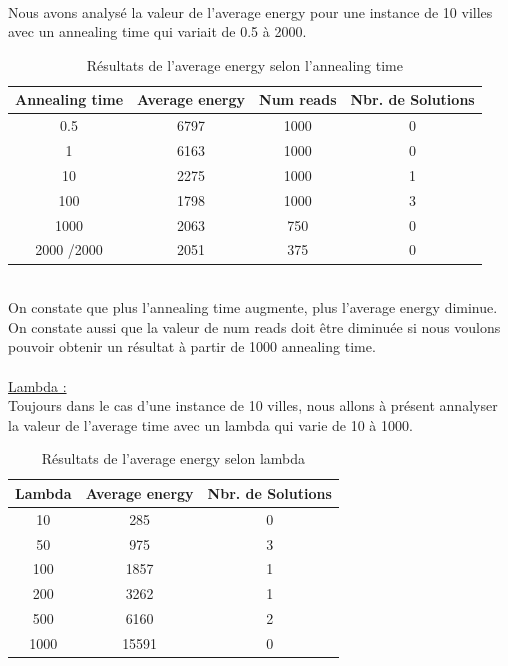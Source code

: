 \documentclass{article}
\begin{document}
        \\
        Nous avons analysé la valeur de l'average energy pour une instance de 10 villes avec un annealing time qui variait de 0.5 à 2000.
        \begin{table}[h]
            \centering
            \begin{tabular}{|c|c|c|c|}
                \hline
                \textbf{Annealing time} & \textbf{Average energy} & \textbf{Num reads} & \textbf{Nbr. de Solutions}\\
                \hline
                0.5  & 6797 & 1000 & 0\\
                \hline
                1  & 6163 & 1000 & 0\\
                \hline
                10  & 2275 & 1000 & 1\\
                \hline
                100  & 1798 & 1000 & 3\\
                \hline
                1000  & 2063 & 750 & 0\\
                \hline
                2000 /2000 & 2051 & 375 & 0\\
                \hline
            \end{tabular}
            \caption{Résultats de l'average energy selon l'annealing time}
            \label{tab:annealing_time}
        \end{table}\\
        On constate que plus l'annealing time augmente, plus l'average energy diminue. On constate aussi que la valeur de num reads doit être diminuée si nous voulons pouvoir obtenir un résultat à partir de 1000 annealing time. \\\\
        \underline{Lambda :} \\
        Toujours dans le cas d'une instance de 10 villes, nous allons à présent annalyser la valeur de l'average time avec un lambda qui varie de 10 à 1000. \\
        \begin{table}[H]
            \centering
            \begin{tabular}{|c|c|c|}
                \hline
                \textbf{Lambda} & \textbf{Average energy} & \textbf{Nbr. de Solutions} \\
                \hline
                10  & 285 & 0\\
                \hline
                50  & 975 & 3\\
                \hline
                100  & 1857 & 1\\
                \hline
                200  & 3262 & 1\\
                \hline
                500  & 6160 & 2\\
                \hline
                1000  & 15591 & 0\\
                \hline
            \end{tabular}
            \caption{Résultats de l'average energy selon lambda}
            \label{tab:lambda}
        \end{table}
\end{document}
